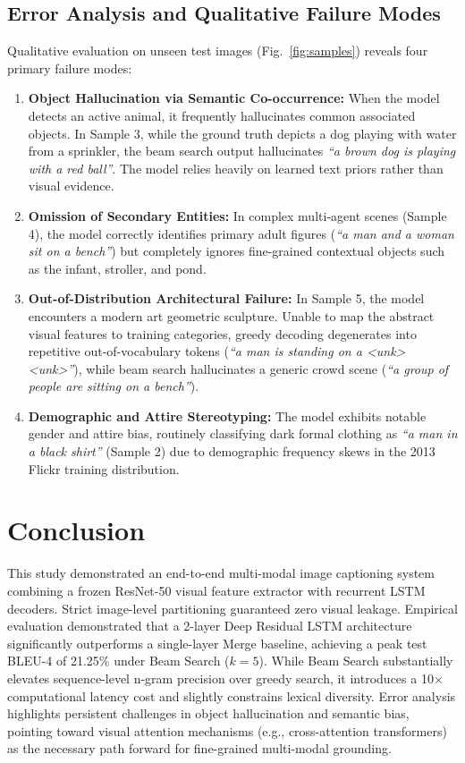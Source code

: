 \documentclass[10pt,conference,a4paper]{IEEEtran}
\begin{document}
\subsection{Error Analysis and Qualitative Failure Modes}
Qualitative evaluation on unseen test images (Fig.~\ref{fig:samples}) reveals four primary failure modes:
\begin{enumerate}
    \item \textbf{Object Hallucination via Semantic Co-occurrence:} When the model detects an active animal, it frequently hallucinates common associated objects. In Sample 3, while the ground truth depicts a dog playing with water from a sprinkler, the beam search output hallucinates \textit{``a brown dog is playing with a red ball''}. The model relies heavily on learned text priors rather than visual evidence.
    \item \textbf{Omission of Secondary Entities:} In complex multi-agent scenes (Sample 4), the model correctly identifies primary adult figures (\textit{``a man and a woman sit on a bench''}) but completely ignores fine-grained contextual objects such as the infant, stroller, and pond.
    \item \textbf{Out-of-Distribution Architectural Failure:} In Sample 5, the model encounters a modern art geometric sculpture. Unable to map the abstract visual features to training categories, greedy decoding degenerates into repetitive out-of-vocabulary tokens (\textit{``a man is standing on a <unk> <unk>''}), while beam search hallucinates a generic crowd scene (\textit{``a group of people are sitting on a bench''}).
    \item \textbf{Demographic and Attire Stereotyping:} The model exhibits notable gender and attire bias, routinely classifying dark formal clothing as \textit{``a man in a black shirt''} (Sample 2) due to demographic frequency skews in the 2013 Flickr training distribution.
\end{enumerate}

\section{Conclusion}
This study demonstrated an end-to-end multi-modal image captioning system combining a frozen ResNet-50 visual feature extractor with recurrent LSTM decoders. Strict image-level partitioning guaranteed zero visual leakage. Empirical evaluation demonstrated that a 2-layer Deep Residual LSTM architecture significantly outperforms a single-layer Merge baseline, achieving a peak test BLEU-4 of 21.25\% under Beam Search ($k=5$). While Beam Search substantially elevates sequence-level n-gram precision over greedy search, it introduces a 10$\times$ computational latency cost and slightly constrains lexical diversity. Error analysis highlights persistent challenges in object hallucination and semantic bias, pointing toward visual attention mechanisms (e.g., cross-attention transformers) as the necessary path forward for fine-grained multi-modal grounding.
\end{document}
